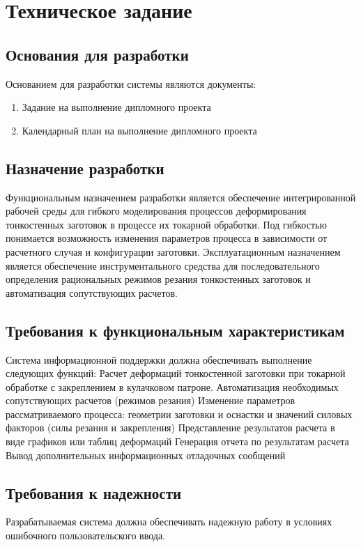 \documentclass[14pt,oneside,final]{extreport}
\begin{document}
	
	\chapter{Техническое задание}	
	
	\section{Основания для разработки}
	Основанием для разработки системы являются документы:
	\begin{enumerate}
	\item Задание на выполнение дипломного проекта
	\item Календарный план на выполнение дипломного проекта
	\end{enumerate}
	
	\section{Назначение разработки}
	    Функциональным назначением разработки является обеспечение интегрированной рабочей среды для гибкого моделирования процессов деформирования тонкостенных заготовок в процессе их токарной обработки. Под гибкостью понимается возможность изменения параметров процесса в зависимости от расчетного случая и конфигурации заготовки. Эксплуатационным назначением является обеспечение инструментального средства для последовательного определения рациональных режимов резания тонкостенных заготовок и автоматизация сопутствующих расчетов.
	
	\section{Требования к функциональным характеристикам}
	    Система информационной поддержки должна обеспечивать выполнение следующих функций:
	Расчет деформаций тонкостенной заготовки при токарной обработке с закреплением в кулачковом патроне.
	Автоматизация необходимых сопутствующих расчетов (режимов резания)
	Изменение параметров рассматриваемого процесса: геометрии заготовки  и оснастки и значений силовых факторов (силы резания и закрепления)
	Представление результатов расчета в виде графиков или таблиц деформаций
	Генерация отчета по результатам расчета
	Вывод дополнительных информационных отладочных сообщений 
	\section{Требования к надежности}
	    Разрабатываемая система должна обеспечивать надежную работу в условиях ошибочного пользовательского ввода.
\end{document}

